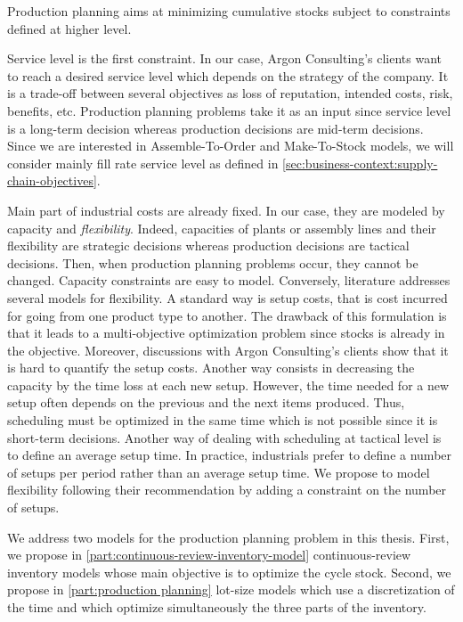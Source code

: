 \medskip


Production planning aims at minimizing cumulative stocks subject to constraints defined at higher level.


Service level is the first constraint.
In our case, Argon Consulting's clients want to reach a desired service level which depends on the strategy of the company.
It is a trade-off between several objectives as loss of reputation, intended costs, risk, benefits, etc.
Production planning problems take it as an input since service level is a long-term decision whereas production decisions are mid-term decisions.
Since we are interested in Assemble-To-Order and Make-To-Stock models, we will consider mainly fill rate service level as defined in \cref{sec:business-context:supply-chain-objectives}.


Main part of industrial costs are already fixed.
In our case, they are modeled by capacity and \emph{flexibility}.
Indeed, capacities of plants or assembly lines and their flexibility are strategic decisions whereas production decisions are tactical decisions.
Then, when production planning problems occur, they cannot be changed.
Capacity constraints are easy to model.
Conversely, literature addresses several models for flexibility.
A standard way is setup costs, that is cost incurred for going from one product type to another.
The drawback of this formulation is that it leads to a multi-objective optimization problem since stocks is already in the objective.
Moreover, discussions with Argon Consulting's clients show that it is hard to quantify the setup costs.
Another way consists in decreasing the capacity by the time loss at each new setup.
However, the time needed for a new setup often depends on the previous and the next items produced.
Thus, scheduling must be optimized in the same time which is not possible since it is short-term decisions.
Another way of dealing with scheduling at tactical level is to define an average setup time.
In practice, industrials prefer to define a number of setups per period rather than an average setup time.
We propose to model flexibility following their recommendation by adding a constraint on the number of setups.


\medskip


We address two models for the production planning problem in this thesis.
First, we propose in \cref{part:continuous-review-inventory-model} continuous-review inventory models whose main objective is to optimize the cycle stock.
Second, we propose in \cref{part:production planning} lot-size models which use a discretization of the time and which optimize simultaneously the three parts of the inventory.


